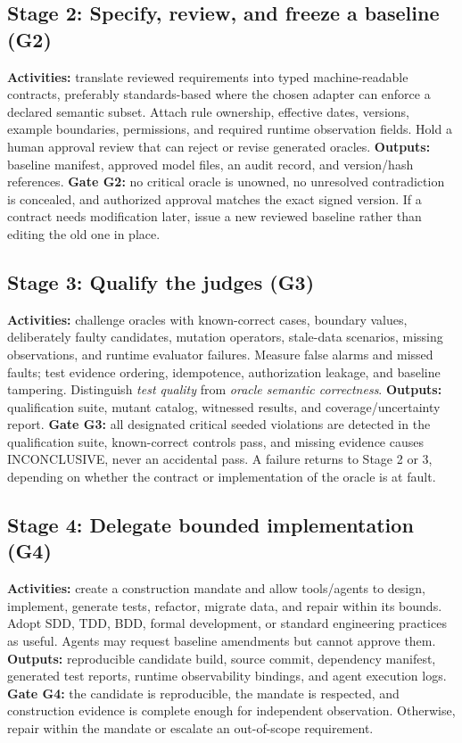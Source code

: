 \documentclass[11pt,a4paper]{article}
\newcommand{\INC}{\textsf{INCONCLUSIVE}}
\begin{document}
\subsection{Stage 2: Specify, review, and freeze a baseline (G2)}
\textbf{Activities:} translate reviewed requirements into typed machine-readable contracts, preferably standards-based where the chosen adapter can enforce a declared semantic subset. Attach rule ownership, effective dates, versions, example boundaries, permissions, and required runtime observation fields. Hold a human approval review that can reject or revise generated oracles. \textbf{Outputs:} baseline manifest, approved model files, an audit record, and version/hash references. \textbf{Gate G2:} no critical oracle is unowned, no unresolved contradiction is concealed, and authorized approval matches the exact signed version. If a contract needs modification later, issue a new reviewed baseline rather than editing the old one in place.

\subsection{Stage 3: Qualify the judges (G3)}
\textbf{Activities:} challenge oracles with known-correct cases, boundary values, deliberately faulty candidates, mutation operators, stale-data scenarios, missing observations, and runtime evaluator failures. Measure false alarms and missed faults; test evidence ordering, idempotence, authorization leakage, and baseline tampering. Distinguish \emph{test quality} from \emph{oracle semantic correctness}. \textbf{Outputs:} qualification suite, mutant catalog, witnessed results, and coverage/uncertainty report. \textbf{Gate G3:} all designated critical seeded violations are detected in the qualification suite, known-correct controls pass, and missing evidence causes \INC{}, never an accidental pass. A failure returns to Stage 2 or 3, depending on whether the contract or implementation of the oracle is at fault.

\subsection{Stage 4: Delegate bounded implementation (G4)}
\textbf{Activities:} create a construction mandate and allow tools/agents to design, implement, generate tests, refactor, migrate data, and repair within its bounds. Adopt SDD, TDD, BDD, formal development, or standard engineering practices as useful. Agents may request baseline amendments but cannot approve them. \textbf{Outputs:} reproducible candidate build, source commit, dependency manifest, generated test reports, runtime observability bindings, and agent execution logs. \textbf{Gate G4:} the candidate is reproducible, the mandate is respected, and construction evidence is complete enough for independent observation. Otherwise, repair within the mandate or escalate an out-of-scope requirement.
\end{document}
